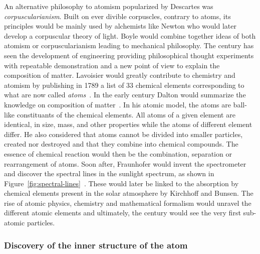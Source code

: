 	An alternative philosophy to atomism popularized by Descartes was \textit{corpuscularianism}. Built on ever divible corpuscles, contrary to atoms, its principles would be mainly used by alchemists like Newton who would later develop a corpuscular theory of light. Boyle would combine together ideas of both atomism or corpuscularianism leading to mechanical philosophy. The  century has seen the development of engineering providing philosophical thought experiments with repeatable demonstration and a new point of view to explain the composition of matter. Lavoisier would greatly contribute to chemistry and atomism by publishing in 1789 a list of 33 chemical elements corresponding to what are now called \textit{atoms}~\cite{LAVOISIER1789}. In the early  century Dalton would summarize the knowledge on composition of matter~\cite{DALTON1808}. In his atomic model, the atoms are ball-like constituants of the chemical elements. All atoms of a given element are identical, in size, mass, and other properties while the atoms of different element differ. He also considered that atoms cannot be divided into smaller particles, created nor destroyed and that they combine into chemical compounds. The essence of chemical reaction would then be the combination, separation or rearrangement of atoms. Soon after, Fraunhofer would invent the spectrometer and discover the spectral lines in the sunlight spectrum, as shown in Figure~\ref{fig:spectral-lines}~\cite{FRAUNHOFER1814}. These would later be linked to the absorption by chemical elements present in the solar atmosphere by Kirchhoff and Bunsen. The rise of atomic physics, chemistry and mathematical formalism would unravel the different atomic elements and ultimately, the  century would see the very first sub-atomic particles.
	
	\subsubsection*{Discovery of the inner structure of the atom}
	\label{chapt2:sssec:atomstructure}

